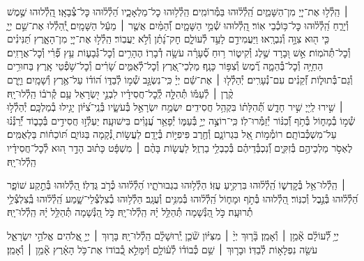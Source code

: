 \documentclass[twoside, openany, parskip=half, 11pt]{book}
\begin{document}
 ׀
הַֽלְ֯ל֣וּ אֶת־יְיָ֭ מִן־הַשָּׁמַ֑יִם הַֽ֝לְ֯ל֗וּהוּ בַּמְּ֯רוֹמִֽים׃
הַֽלְ֯ל֥וּהוּ כׇל־מַלְאָכָ֑יו הַ֝לְ֯ל֗וּהוּ כׇּל־צְ֯בָאָֽו׃
הַֽ֭לְ֯לוּהוּ שֶׁ֣מֶשׁ וְ֯יָרֵ֑חַ הַֽ֝לְ֯ל֗וּהוּ כׇּל־כּ֥וֹכְ֯בֵי אֽוֹר׃
הַֽ֭לְ֯לוּהוּ שְׁ֯מֵ֣י הַשָּׁמָ֑יִם וְ֯֝הַמַּ֗יִם אֲשֶׁ֤ר ׀ מֵעַ֬ל הַשָּׁמָֽיִם׃
יְֽ֭֯הַלְ֯לוּ אֶת־שֵׁ֣ם יְיָ֑ כִּ֤י ה֖וּא צִוָּ֣ה וְ֯נִבְרָֽאוּ׃
וַיַּעֲמִידֵ֣ם לָעַ֣ד לְ֯עוֹלָ֑ם חׇק־נָ֝תַ֗ן וְ֯לֹ֣א יַעֲבֽוֹר׃
הַֽלְ֯ל֣וּ אֶת־יְיָ֭ מִן־הָאָ֑רֶץ תַּ֝נִּינִ֗ים וְ֯כׇל־תְּ֯הֹמֽוֹת׃
אֵ֣שׁ וּ֭בָרָד שֶׁ֣לֶג וְ֯קִיט֑וֹר ר֥וּחַ סְ֯֝עָרָ֗ה עֹשָׂ֥ה דְ֯בָרֽוֹ׃
הֶהָרִ֥ים וְ֯כׇל־גְּ֯בָע֑וֹת עֵ֥ץ פְּ֯֝רִ֗י וְ֯כׇל־אֲרָזִֽים׃
הַחַיָּ֥ה וְ֯כׇל־בְּ֯הֵמָ֑ה רֶ֗֝מֶשׂ וְ֯צִפּ֥וֹר כָּנָֽף׃
מַלְכֵי־אֶ֭רֶץ וְ֯כׇל־לְ֯אֻמִּ֑ים שָׂ֝רִ֗ים וְ֯כׇל־שֹׁ֥פְ֯טֵי אָֽרֶץ׃
בַּחוּרִ֥ים וְ֯גַם־בְּ֯תוּל֑וֹת זְ֯֝קֵנִ֗ים עִם־נְ֯עָרִֽים׃
יְ֯הַלְ֯ל֤וּ ׀ אֶת־שֵׁ֬ם יְיָ֗ כִּֽי־נִשְׂגָּ֣ב שְׁ֯מ֣וֹ לְ֯בַדּ֑וֹ
ה֝וֹד֗וֹ עַל־אֶ֥רֶץ וְ֯שָׁמָֽיִם׃ וַיָּ֤רֶם קֶ֨רֶן ׀ לְ֯עַמּ֡וֹ תְּ֯הִלָּ֤ה לְֽ֯כׇל־חֲסִידָ֗יו
לִבְנֵ֣י יִ֭שְׂרָאֵל עַ֥ם קְ֯רֹב֗וֹ הַֽלְ֯לוּ־יָֽהּ׃\\
 ׀
שִׁ֣ירוּ לַֽייָ֭ שִׁ֣יר חָדָ֑שׁ תְּ֯֝הִלָּת֗וֹ בִּקְהַ֥ל חֲסִידִֽים׃
יִשְׂמַ֣ח יִשְׂרָאֵ֣ל בְּ֯עֹשָׂ֑יו בְּ֯נֵֽי־צִ֝יּ֗וֹן יָגִ֥ילוּ בְ֯מַלְכָּֽם׃
יְ֯הַלְ֯ל֣וּ שְׁ֯מ֣וֹ בְ֯מָח֑וֹל בְּ֯תֹ֥ף וְ֯֝כִנּ֗וֹר יְ֯זַמְּ֯רוּ־לֽוֹ׃
כִּֽי־רוֹצֶ֣ה יְיָ֣ בְּ֯עַמּ֑וֹ יְ֯פָאֵ֥ר עֲ֝נָוִ֗ים בִּישׁוּעָֽה׃
יַעְלְ֯ז֣וּ חֲסִידִ֣ים בְּ֯כָב֑וֹד יְ֯֝רַנְּ֯נ֗וּ עַל־מִשְׁכְּ֯בוֹתָֽם׃
רוֹמְ֯מ֣וֹת אֵ֭ל בִּגְרוֹנָ֑ם וְ֯חֶ֖רֶב פִּיפִיּ֣וֹת בְּ֯יָדָֽם׃
לַעֲשׂ֣וֹת נְ֭֯קָמָה בַּגּוֹיִ֑ם תּ֝וֹכֵח֗וֹת בַּלְאֻמִּֽים׃
לֶאְסֹ֣ר מַלְכֵיהֶ֣ם בְּ֯זִקִּ֑ים וְ֯֝נִכְבְּ֯דֵיהֶ֗ם בְּ֯כַבְלֵ֥י בַרְזֶֽל׃
לַעֲשׂ֤וֹת בָּהֶ֨ם ׀ מִשְׁפָּ֬ט כָּת֗וּב הָדָ֣ר ה֭וּא לְ֯כׇל־חֲסִידָ֗יו הַֽלְ֯לוּ־יָֽהּ׃

 ׀ \hfill
הַֽלְ֯לוּ־אֵ֥ל בְּ֯קׇדְשׁ֑וֹ הַֽ֝לְ֯ל֗וּהוּ בִּרְקִ֥יעַ עֻזּֽוֹ׃
הַלְ֯ל֥וּהוּ בִגְבוּרֹתָ֑יו הַ֝לְ֯ל֗וּהוּ כְּ֯רֹ֣ב גֻּדְלֽוֹ׃
הַ֭לְ֯לוּהוּ בְּ֯תֵ֣קַע שׁוֹפָ֑ר הַ֝לְ֯ל֗וּהוּ בְּ֯נֵ֣בֶל וְ֯כִנּֽוֹר׃
הַ֭לְ֯לוּהוּ בְּ֯תֹ֣ף וּמָח֑וֹל הַֽ֝לְ֯ל֗וּהוּ בְּ֯מִנִּ֥ים וְ֯עֻגָֽב׃
הַלְ֯ל֥וּהוּ בְ֯צִלְצְ֯לֵי־שָׁ֑מַע הַֽ֝לְ֯ל֗וּהוּ בְּֽ֯צִלְצְ֯לֵ֥י תְ֯רוּעָֽה׃
כֹּ֣ל הַ֭נְּ֯שָׁמָה תְּ֯הַלֵּ֥ל יָ֗הּ הַֽלְ֯לוּ־יָֽהּ׃
\scriptsize{כֹּ֣ל הַ֭נְּ֯שָׁמָה תְּ֯הַלֵּ֥ל יָ֗הּ הַֽלְ֯לוּ־יָֽהּ׃ \\}
\normalsize{}

\negline

יְיָ֥ לְ֯֝עוֹלָ֗ם אָ֘מֵ֥ן ׀ וְ֯אָמֵֽן׃ \hfill \break
{}בָּ֘ר֤וּךְ יְיָ֨ ׀ מִצִּיּ֗וֹן שֹׁ֘כֵ֤ן יְֽ֯רוּשָׁלָ֗‍ִם הַֽלְ֯לוּ־יָֽהּ׃ \hfill \break
{}בָּר֤וּךְ ׀ יְיָ֣ אֱ֭לֹהִים אֱלֹהֵ֣י יִשְׂרָאֵ֑ל עֹשֵׂ֖ה נִפְלָא֣וֹת לְ֯בַדּֽוֹ׃ \hfill \break
וּבָר֤וּךְ ׀ שֵׁ֥ם כְּ֯בוֹד֗וֹ לְ֯ע֫וֹלָ֥ם וְ֯יִמָּלֵ֣א כְ֭֯בוֹדוֹ אֶת־כֹּ֥ל הָאָ֗רֶץ אָ֘מֵ֥ן ׀ וְ֯אָמֵֽן׃
\end{document}
